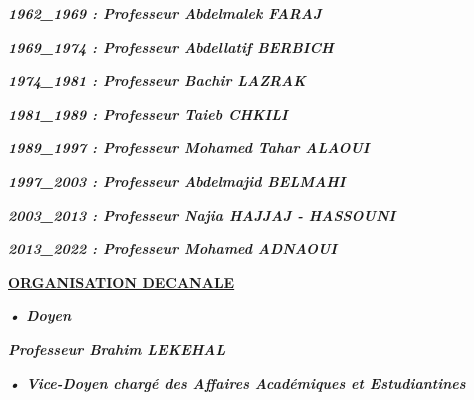 \noindent
\begin{tcolorbox}[colback=white, colframe=white]
\textbf{\emph{1962\_1969 : Professeur Abdelmalek FARAJ}}\\ \vspace*{.4em}

\textbf{\emph{1969\_1974 : Professeur Abdellatif BERBICH}}\\ \vspace*{.4em}

\textbf{\emph{1974\_1981 : Professeur Bachir LAZRAK}}\\ \vspace*{.4em}

\textbf{\emph{1981\_1989 : Professeur Taieb CHKILI}}\\ \vspace*{.4em}

\textbf{\emph{1989\_1997 : Professeur Mohamed Tahar ALAOUI}}\\ \vspace*{.4em}

\textbf{\emph{1997\_2003 : Professeur Abdelmajid BELMAHI}}\\ \vspace*{.4em}

\textbf{\emph{2003\_2013 : Professeur Najia HAJJAJ - HASSOUNI}}\\ \vspace*{.4em}

\textbf{\emph{2013\_2022 : Professeur Mohamed ADNAOUI}} \\ \vspace*{.4em}

\end{tcolorbox}

\textbf{\underline{ORGANISATION DECANALE}}

\vspace*{.5em}

\hspace*{.8em} \textbf{\emph{•	Doyen}}

\vspace*{.8em}

\textbf{\emph{Professeur Brahim LEKEHAL}}

\vspace*{.8em}

\hspace*{.8em} \textbf{\emph{•	Vice-Doyen chargé des Affaires Académiques et Estudiantines }}

\vspace*{.8em}

